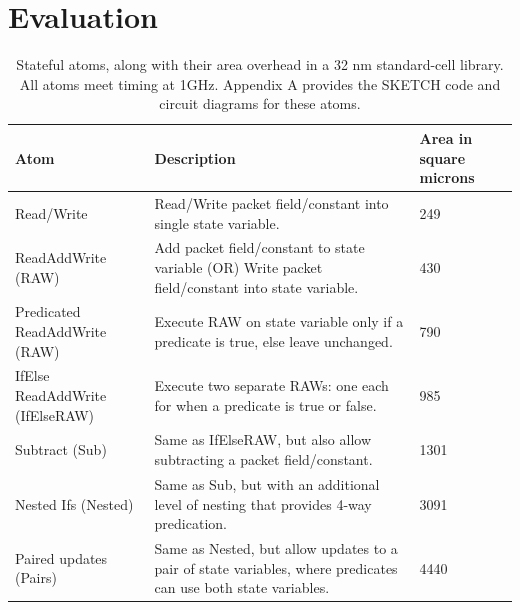 \section{Evaluation}


\label{s:eval}

\begin{table}[!t]
  \begin{scriptsize}
  \begin{tabular}{|p{}|p{}|p{}|}
    \hline
    Atom & Description & Area in square microns \\
    \hline
    Read/Write & Read/Write packet field/constant into single state variable. & 249 \\
    \hline
    ReadAddWrite (RAW) & Add packet field/constant to state variable (OR) Write packet field/constant into state variable. & 430 \\
    \hline
    Predicated ReadAddWrite (RAW) & Execute RAW on state variable only if a predicate is true, else leave unchanged. & 790 \\
    \hline
    IfElse ReadAddWrite (IfElseRAW) & Execute two separate RAWs: one each for when a predicate is true or false. & 985 \\
    \hline
    Subtract (Sub) & Same as IfElseRAW, but also allow subtracting a packet field/constant. & 1301 \\
    \hline
    Nested Ifs (Nested) & Same as Sub, but with an additional level of nesting that provides 4-way predication. & 3091 \\
    \hline
    Paired updates (Pairs) & Same as Nested, but allow updates to a pair of state variables, where predicates can use both state variables. & 4440 \\
    \hline
  \end{tabular}
  \end{scriptsize}
  \caption{Stateful atoms, along with their area overhead in a 32 nm standard-cell library.
    All atoms meet timing at 1GHz. Appendix A provides the SKETCH code and
  circuit diagrams for these atoms.}
  \label{tab:templates}
\end{table}

